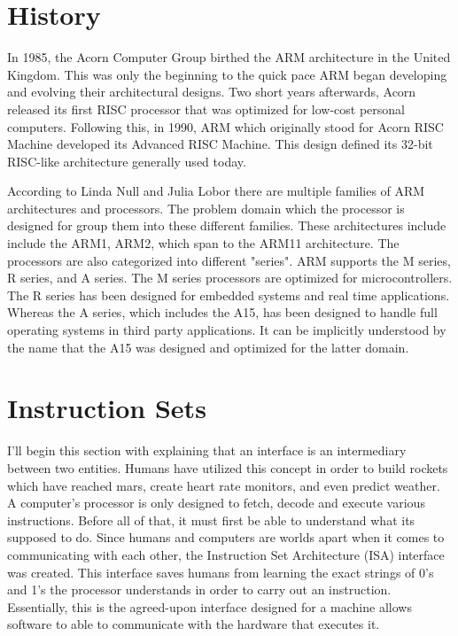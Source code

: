 \documentclass[12pt]{scrreprt}
\begin{document}
\tableofcontents

\chapter{History}

	In 1985, the Acorn Computer Group birthed the ARM architecture in the United Kingdom. This was only the beginning to
	the quick pace ARM began developing and evolving their architectural designs. Two short years afterwards, Acorn 
	released its first RISC processor that was optimized for low-cost personal computers. Following this, in 1990, ARM 
	which originally stood for Acorn RISC Machine developed its Advanced RISC Machine. This design defined its 32-bit RISC-like
	architecture generally used today.

	According to Linda Null and Julia Lobor there are multiple families of ARM architectures and processors. 
	The problem domain which the processor is designed for group them into these different families. 
	These architectures include include the ARM1, ARM2, which span to the ARM11 architecture.
	The processors are also categorized into different "series".
	ARM supports the M series, R series, and A series.
	The M series processors are optimized for microcontrollers. 
	The R series has been designed for embedded systems and real time applications.
	Whereas the A series, which includes the A15, has been designed to handle full operating systems in third party applications. 
	It can be implicitly understood by the name that the A15 was designed and optimized for the latter domain.

{\let\clearpage\relax\chapter{Instruction Sets}}

	I'll begin this section with explaining that an interface is an intermediary between two entities.
	Humans have utilized this concept in order to build rockets which have reached mars, create heart rate monitors, and even predict weather. 
	A computer's processor is only designed to fetch, decode and execute various instructions.
	Before all of that, it must first be able to understand what its supposed to do.
	Since humans and computers are worlds apart when it comes to communicating with each other, the Instruction Set Architecture (ISA) interface was created.
	This interface saves humans from learning the exact strings of 0's and 1's the processor understands in order to carry out an instruction.
	Essentially, this is the agreed-upon interface designed for a machine allows software to able to communicate with the hardware that executes it.
\end{document}
